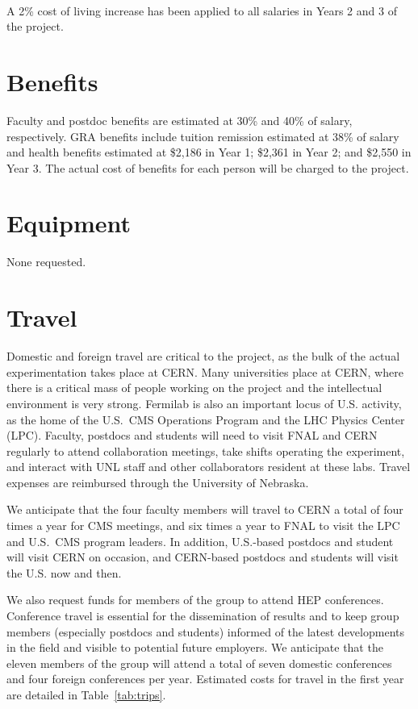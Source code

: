 \documentclass[11pt]{article}
\begin{document}
\paragraph{}
\noindent A 2\% cost of living increase has been applied to all salaries in Years 2
and 3 of the project.

\section{Benefits}
Faculty and postdoc benefits are estimated at 30\% and 40\% of salary,
respectively.  GRA benefits include tuition remission estimated at 38\% of
salary and health benefits estimated at \$2,186 in Year 1; \$2,361 in Year
2; and \$2,550 in Year 3. The actual cost of benefits for each person will
be charged to the project.

\section{Equipment} 
None requested.

\section{Travel}
Domestic and foreign travel are critical to the project, as the bulk of the
actual experimentation takes place at CERN.  Many universities place at
CERN, where there is a critical mass of people working on the project and
the intellectual environment is very strong.  Fermilab is also an important
locus of U.S. activity, as the home of the U.S.~CMS Operations Program and
the LHC Physics Center (LPC).  Faculty, postdocs and students will need to
visit FNAL and CERN regularly to attend collaboration meetings, take shifts
operating the experiment, and interact with UNL staff and other
collaborators resident at these labs.  Travel expenses are reimbursed
through the University of Nebraska.

We anticipate that the four faculty members will travel to CERN a
total of four times a year for CMS meetings, and six times a
year to FNAL to visit the LPC and U.S.~CMS program leaders.  In addition,
U.S.-based postdocs and student will visit CERN on occasion, and CERN-based
postdocs and students will visit the U.S. now and then.

We also request funds for members of the group to attend HEP conferences.
Conference travel is essential for the dissemination of results and to keep
group members (especially postdocs and students) informed of the latest
developments in the field and visible to potential future employers.  We
anticipate that the eleven members of the group will attend a total of
seven domestic conferences and four foreign conferences per year.  Estimated
costs for travel in the first year are detailed in Table~\ref{tab:trips}.
\end{document}
